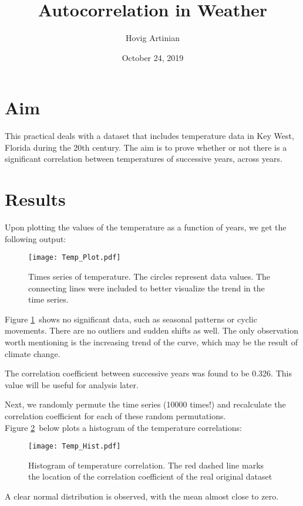 \documentclass[12pt]{article}
\title{Autocorrelation in Weather}
\author{Hovig Artinian}
\date{October 24, 2019}
\begin{document}
    \maketitle
  
    \section{Aim}
        This practical deals with a dataset that includes temperature data in Key West, Florida during the 20th century.
        The aim is to prove whether or not there is a significant correlation between temperatures of successive years, across years.

    \section{Results}
    Upon plotting the values of the temperature as a function of years, we get the following output:
    \begin{figure}[h]
    \texttt{[image: Temp\_Plot.pdf]}
    \centering
    \caption[scale = 0.5]{Times series of temperature. The circles represent data values. The connecting lines were included to better visualize the trend in the time series.}
    \label{plot}
    \end{figure}
    
    Figure \ref{plot}\ shows no significant data, such as seasonal patterns or cyclic movements. There are no outliers and sudden shifts as well. The only observation worth mentioning is the increasing trend of the curve, which may be the result of climate change.

    The correlation coefficient between successive years was found to be 0.326. This value will be useful for analysis later.

    Next, we randomly permute the time series (10000 times!) and recalculate the correlation coefficient for each of these random permutations.\\
    
    Figure \ref{hist}\ below plots a histogram of the temperature correlations:
    \begin{figure}[h]
    \texttt{[image: Temp\_Hist.pdf]}
    \centering
    \caption{Histogram of temperature correlation. The red dashed line marks the location of the correlation coefficient of the real original dataset}
    \label{hist}
    \end{figure}

    A clear normal distribution is observed, with the mean almost close to zero.
\end{document}
